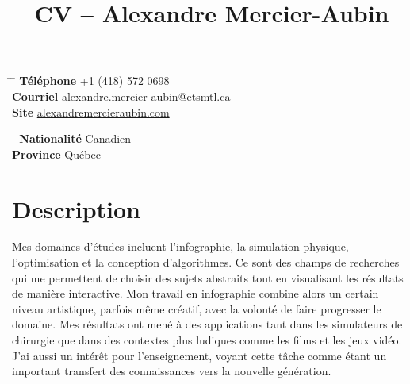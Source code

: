 \documentclass[10pt]{article} %
\begin{document}

\title{CV -- Alexandre Mercier-Aubin} %


\parbox{0.5\textwidth}{ %
\begin{tabbing} %
\hspace{3cm} \= \hspace{4cm} \= \kill %
{\bf Téléphone} \> +1 (418) 572 0698 \\ %
{\bf Courriel} \> \href{mailto:alexandre.mercier-aubin@etsmtl.ca}{alexandre.mercier-aubin@etsmtl.ca} \\ %
{\bf Site} \> \href{https://alexandremercieraubin.com}{alexandremercieraubin.com} \\
\end{tabbing}}
\hfill %
\parbox{0.5\textwidth}{ %
\begin{tabbing} %
\hspace{3cm} \= \hspace{4cm} \= \kill %
{\bf Nationalité} \> Canadien \\ %
{\bf Province} \> {Québec}\\
\end{tabbing}}

\vspace{-0.7cm} 

\justifying

\section{Description}

Mes domaines d'études incluent l'infographie, la simulation physique, l'optimisation et la conception d'algorithmes. Ce sont des champs de recherches qui me permettent de choisir des sujets abstraits tout en visualisant les résultats de manière interactive. Mon travail en infographie combine alors un certain niveau artistique, parfois même créatif, avec la volonté de faire progresser le domaine. Mes résultats ont mené à des applications tant dans les simulateurs de chirurgie que dans des contextes plus ludiques comme les films et les jeux vidéo. J'ai aussi un intérêt pour l'enseignement, voyant cette tâche comme étant un important transfert des connaissances vers la nouvelle génération.
\end{document}
